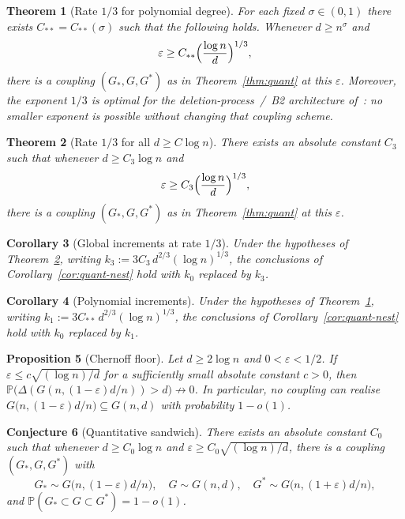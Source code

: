 \documentclass[11pt]{article}
\newtheorem{theorem}{Theorem}
\newtheorem{corollary}[theorem]{Corollary}
\newtheorem{proposition}[theorem]{Proposition}
\newtheorem{conjecture}[theorem]{Conjecture}
\newcommand{\Gnd}{G(n,d)}
\newcommand{\PP}{\mathbb{P}}
\begin{document}
\begin{theorem}[Rate \(1/3\) for polynomial degree]
\label{thm:quant-third}
For each fixed \(\sigma\in(0,1)\) there exists \(C_{**}=C_{**}(\sigma)\) such that the following
holds.
Whenever \(d\ge n^{\sigma}\) and
\[
\varepsilon\ge C_{**}\Bigl(\frac{\log n}{d}\Bigr)^{1/3},
\]
there is a coupling \((G_*,G,G^*)\) as in Theorem~\ref{thm:quant} at this
\(\varepsilon\).
Moreover, the exponent \(1/3\) is optimal for the deletion-process~/~B2
architecture of~\cite[§3]{BIM25}: no smaller exponent is possible without
changing that coupling scheme.
\end{theorem}

\begin{theorem}[Rate \(1/3\) for all \(d\ge C\log n\)]
\label{thm:quant-third-global}
There exists an absolute constant \(C_3\) such that whenever
\(d\ge C_3\log n\) and
\[
\varepsilon\ge C_3\Bigl(\frac{\log n}{d}\Bigr)^{1/3},
\]
there is a coupling \((G_*,G,G^*)\) as in Theorem~\ref{thm:quant} at this
\(\varepsilon\).
\end{theorem}

\begin{corollary}[Global increments at rate \(1/3\)]
\label{cor:global-inc}
Under the hypotheses of Theorem~\ref{thm:quant-third-global}, writing
\(k_3:=3C_3\,d^{2/3}(\log n)^{1/3}\), the conclusions of
Corollary~\ref{cor:quant-nest} hold with \(k_0\) replaced by \(k_3\).
\end{corollary}

\begin{corollary}[Polynomial increments]
\label{cor:poly-inc}
Under the hypotheses of Theorem~\ref{thm:quant-third}, writing
\(k_1:=3C_{**}\,d^{2/3}(\log n)^{1/3}\), the conclusions of
Corollary~\ref{cor:quant-nest} hold with \(k_0\) replaced by \(k_1\).
\end{corollary}

\begin{proposition}[Chernoff floor]
\label{prop:chernoff}
Let \(d\ge 2\log n\) and \(0<\varepsilon<1/2\).
If \(\varepsilon\le c\sqrt{(\log n)/d}\) for a sufficiently small absolute constant \(c>0\),
then \(\PP\bigl(\Delta(G(n,(1-\varepsilon)d/n))>d\bigr)\not\to 0\).
In particular, no coupling can realise
\(G\bigl(n,(1-\varepsilon)d/n\bigr)\subseteq\Gnd\) with probability \(1-o(1)\).
\end{proposition}

\begin{conjecture}[Quantitative sandwich]
\label{conj:Q}
There exists an absolute constant \(C_0\) such that whenever \(d\ge C_0\log n\) and
\(\varepsilon\ge C_0\sqrt{(\log n)/d}\), there is a coupling
\((G_*,G,G^*)\) with
\[
G_*\sim G\bigl(n,(1-\varepsilon)d/n\bigr),\quad
G\sim\Gnd,\quad
G^*\sim G\bigl(n,(1+\varepsilon)d/n\bigr),
\]
and \(\PP(G_*\subset G\subset G^*)=1-o(1)\).
\end{conjecture}
\end{document}
